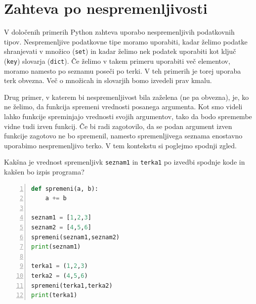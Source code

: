 \section{Zahteva po nespremenljivosti}
V določenih primerih Python zahteva uporabo nespremenljivih podatkovnih tipov. Nespremenljive podatkovne tipe moramo uporabiti, kadar želimo podatke shranjevati v množico (\texttt{set}) in kadar želimo nek podatek uporabiti kot ključ (\texttt{key}) slovarja (\texttt{dict}). Če želimo v takem primeru uporabiti več elementov, moramo namesto po seznamu poseči po terki. V teh primerih je torej uporaba terk obvezna. Več o množicah in slovarjih bomo izvedeli prav kmalu.

Drug primer, v katerem bi nespremenljivost bila zaželena (ne pa obvezna), je, ko ne želimo, da funkcija spremeni vrednosti posanega argumenta. Kot smo videli lahko funkcije spreminjajo vrednosti svojih argumentov, tako da bodo spremembe vidne tudi izven funkcij. Če bi radi zagotovilo, da se podan argument izven funkcije zagotovo ne bo spremenil, namesto spremenljivega seznama enostavno uporabimo nespremenljivo terko. V tem kontekstu si poglejmo spodnji zgled.

\begin{zgled}
Kakšna je vrednost spremenljivk \texttt{seznam1} in \texttt{terka1}  po izvedbi spodnje kode in kakšen bo izpis programa?
\begin{lstlisting}[language=Python,numbers=left]
def spremeni(a, b):
    a += b

seznam1 = [1,2,3]
seznam2 = [4,5,6]
spremeni(seznam1,seznam2)
print(seznam1)

terka1 = (1,2,3)
terka2 = (4,5,6)
spremeni(terka1,terka2)
print(terka1)
\end{lstlisting}
\end{zgled}

